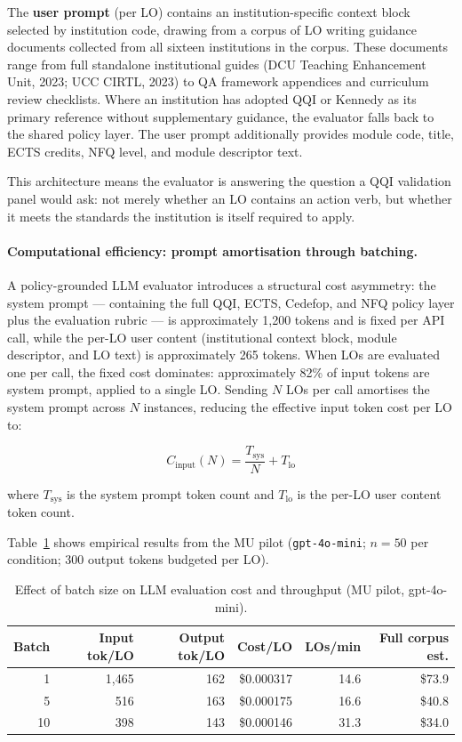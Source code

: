\documentclass[12pt, a4paper]{article}
\begin{document}
The \textbf{user prompt} (per LO) contains an institution-specific context block
selected by institution code, drawing from a corpus of LO writing guidance documents
collected from all sixteen institutions in the corpus. These documents range from
full standalone institutional guides (DCU Teaching Enhancement Unit, 2023; UCC CIRTL,
2023) to QA framework appendices and curriculum review checklists. Where an institution
has adopted QQI or Kennedy \citeyear{kennedy2007writing} as its primary reference without
supplementary guidance, the evaluator falls back to the shared policy layer. The
user prompt additionally provides module code, title, ECTS credits, NFQ level, and
module descriptor text.

This architecture means the evaluator is answering the question a QQI validation
panel would ask: not merely whether an LO contains an action verb, but whether it
meets the standards the institution is itself required to apply.

\paragraph{Computational efficiency: prompt amortisation through batching.}
A policy-grounded LLM evaluator introduces a structural cost asymmetry: the system
prompt --- containing the full QQI, ECTS, Cedefop, and NFQ policy layer plus the
evaluation rubric --- is approximately 1,200 tokens and is fixed per API call, while
the per-LO user content (institutional context block, module descriptor, and LO text)
is approximately 265 tokens. When LOs are evaluated one per call, the fixed cost
dominates: approximately 82\% of input tokens are system prompt, applied to a single
LO. Sending $N$ LOs per call amortises the system prompt across $N$ instances,
reducing the effective input token cost per LO to:

\begin{equation}
  C_{\text{input}}(N) = \frac{T_{\text{sys}}}{N} + T_{\text{lo}}
\end{equation}

where $T_{\text{sys}}$ is the system prompt token count and $T_{\text{lo}}$ is the
per-LO user content token count.

Table~\ref{tab:batch} shows empirical results from the MU pilot
(\texttt{gpt-4o-mini}; $n = 50$ per condition; 300 output tokens budgeted per LO).

\begin{table}[H]
\centering
\caption{Effect of batch size on LLM evaluation cost and throughput (MU pilot, gpt-4o-mini).}
\label{tab:batch}
\begin{tabular}{rrrrrr}
\toprule
\textbf{Batch} & \textbf{Input tok/LO} & \textbf{Output tok/LO} & \textbf{Cost/LO} & \textbf{LOs/min} & \textbf{Full corpus est.} \\
\midrule
1  & 1,465 & 162 & \$0.000317 & 14.6 & \$73.9 \\
5  &   516 & 163 & \$0.000175 & 16.6 & \$40.8 \\
10 &   398 & 143 & \$0.000146 & 31.3 & \$34.0 \\
\bottomrule
\end{tabular}
\end{table}
\end{document}
